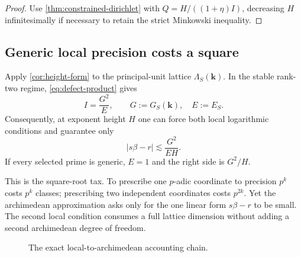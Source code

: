 \documentclass[11pt,oneside]{article}
\theoremstyle{definition}
\begin{document}
\begin{proof}
Use \cref{thm:constrained-dirichlet} with
$Q=H/((1+\eta)I)$, decreasing $H$ infinitesimally if necessary to retain
the strict Minkowski inequality.
\end{proof}

\subsection{Generic local precision costs a square}

Apply \cref{cor:height-form} to the principal-unit lattice
$\Lambda_S(\bm{k})$.  In the stable rank-two regime,
\eqref{eq:defect-product} gives
\begin{equation}\label{eq:I-G-E}
  I=\frac{G^2}{E},
  \qquad G:=G_S(\bm{k}),\quad E:=E_S.
\end{equation}
Consequently, at exponent height $H$ one can force both local logarithmic
conditions and guarantee only
\begin{equation}\label{eq:square-root-tax}
  |s\beta-r|
  \lesssim\frac{G^2}{EH}.
\end{equation}
If every selected prime is generic, $E=1$ and the right side is
$G^2/H$.

This is the square-root tax.  To prescribe one $p$-adic coordinate to
precision $p^k$ costs $p^k$ classes; prescribing two independent
coordinates costs $p^{2k}$.  Yet the archimedean approximation asks only
for the one linear form $s\beta-r$ to be small.  The second local
condition consumes a full lattice dimension without adding a second
archimedean degree of freedom.

\begin{figure}[ht]
\centering
{}
\caption{The exact local-to-archimedean accounting chain.}
\label{fig:accounting-chain}
\end{figure}
\end{document}
